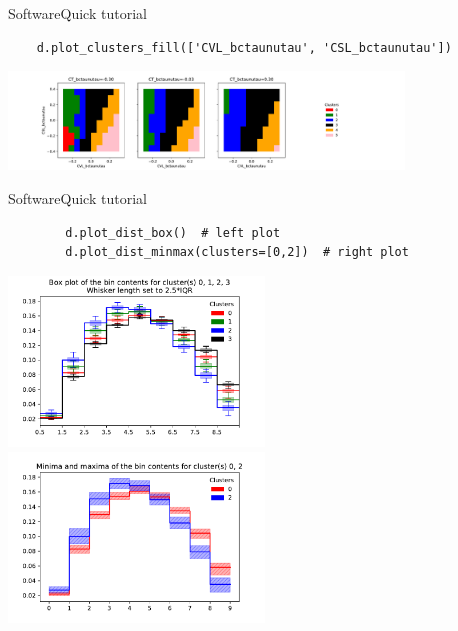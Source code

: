 \begin{frame}[fragile, t]{Software}{Quick tutorial}
\vspace{0.75cm}
\begin{verbatim}
    d.plot_clusters_fill(['CVL_bctaunutau', 'CSL_bctaunutau'])
\end{verbatim}
\centering
\includegraphics[trim=3cm 0 11cm 0, clip, width=10.5cm]{figures/plots/2dfill.pdf}
\end{frame}

\begin{frame}[fragile]{Software}{Quick tutorial}
    \begin{verbatim}
        d.plot_dist_box()  # left plot
        d.plot_dist_minmax(clusters=[0,2])  # right plot
    \end{verbatim}
    
    \bigskip
    \begin{changemargin}{-1.2cm}{-1.2cm}
        \includegraphics[width=6.8cm]{figures/plots/box_plot.pdf}\hspace{-0.5cm}
        \includegraphics[width=6.8cm]{figures/plots/plot_minmax_02.pdf}\\
    \end{changemargin}
\end{frame}
